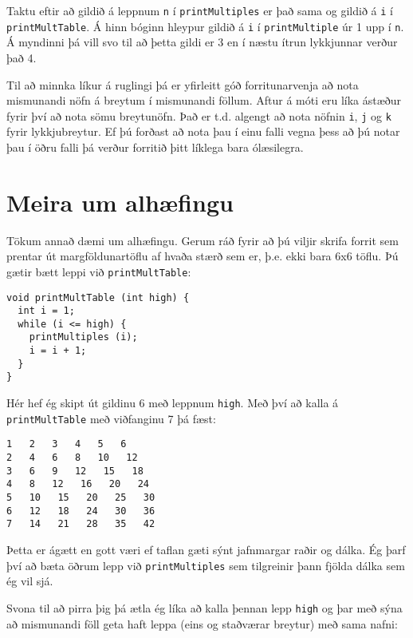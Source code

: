 \vspace{0.1in}
\centerline{}
\vspace{0.1in}
%
Taktu eftir að gildið á leppnum {\tt n} í {\tt printMultiples} er það sama og gildið á {\tt i} í {\tt printMultTable}.
Á hinn bóginn hleypur gildið á {\tt i} í {\tt printMultiple} úr 1 upp í {\tt n}.
Á myndinni þá vill svo til að þetta gildi er 3 en í næstu ítrun lykkjunnar verður það 4.

Til að minnka líkur á ruglingi þá er yfirleitt góð forritunarvenja að nota mismunandi nöfn á breytum í mismunandi föllum.
Aftur á móti eru líka ástæður fyrir því að nota sömu breytunöfn.
Það er t.d. algengt að nota nöfnin {\tt i}, {\tt j} og {\tt k} fyrir lykkjubreytur.
Ef þú forðast að nota þau í einu falli vegna þess að þú notar þau í öðru falli þá verður forritið þitt líklega bara ólæsilegra.


\section{Meira um alhæfingu}

Tökum annað dæmi um alhæfingu.
Gerum ráð fyrir að þú viljir skrifa forrit sem prentar út margföldunartöflu af hvaða stærð sem er, þ.e. ekki bara 6x6 töflu.
Þú gætir bætt leppi við {\tt printMultTable}:

\begin{verbatim}
void printMultTable (int high) {
  int i = 1;
  while (i <= high) {
    printMultiples (i);
    i = i + 1;
  }
}
\end{verbatim}
%
Hér hef ég skipt út gildinu 6 með leppnum {\tt high}.
Með því að kalla á {\tt printMultTable} með viðfanginu 7 þá fæst:

\begin{verbatim}
1   2   3   4   5   6   
2   4   6   8   10   12   
3   6   9   12   15   18   
4   8   12   16   20   24   
5   10   15   20   25   30   
6   12   18   24   30   36   
7   14   21   28   35   42   
\end{verbatim}
%
Þetta er ágætt en gott væri ef taflan gæti sýnt jafnmargar raðir og dálka.
Ég þarf því að bæta öðrum lepp við {\tt printMultiples} sem tilgreinir þann fjölda dálka sem ég vil sjá.

Svona til að pirra þig þá ætla ég líka að kalla þennan lepp {\tt high} og þar með sýna að mismunandi föll geta haft leppa (eins og staðværar breytur) með sama nafni:


